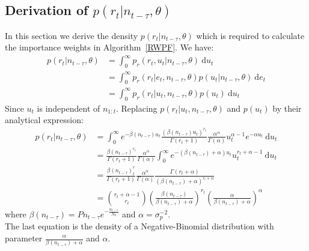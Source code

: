 \documentclass[12pt]{article}
\begin{document}
\begin{appendices}
	\subsection{Derivation of $p(r_t|n_{t-\tau}, \theta)$} \label{rDensity}
	In this section we derive the density $p(r_t|n_{t-\tau}, \theta)$ which is required to calculate the importance weights in Algorithm~\ref{RWPF}.
	We have:
	\begin{align*}
	p(r_t | n_{t-\tau}, \theta) & = \int_{0}^{\infty}p_r(r_t, u_t | n_{t-\tau}, \theta)\ \mathrm{d}u_t \\
	& = \int_{0}^{\infty}p_r(r_t | e_t, n_{t-\tau}, \theta)p(u_t | n_{t-\tau}, \theta)\ \mathrm{d}e_t \\
	& = \int_{0}^{\infty}p_r(r_t | u_t, n_{t-\tau}, \theta)p(u_t)\ \mathrm{d}u_t
	\end{align*}
	Since $u_t$ is independent of $n_{1:t}$.
	Replacing $p(r_t | u_t, n_{t-\tau}, \theta)$ and $p(u_t)$ by their analytical expression:
	\begin{align*}
	p(r_t | n_{t-\tau}, \theta) & = \int_{0}^{\infty}e^{-\beta(n_{t-\tau})u_t}\frac{(\beta(n_{t-\tau})u_t)^{r_t}}{\Gamma(r_t+1)}\frac{\alpha^\alpha}{\Gamma(\alpha)}u_t^{\alpha-1}e^{-\alpha u_t}\ \mathrm{d}u_t \\
	& = \frac{\beta(n_{t-\tau})^{r_t}}{\Gamma(r_t+1)}\frac{\alpha^\alpha}{\Gamma(\alpha)}\int_{0}^{\infty}e^{-(\beta(n_{t-\tau})+\alpha)u_t}u_t^{r_t+\alpha-1}\ \mathrm{d}u_t \\
	& = \frac{\beta(n_{t-\tau})^r_t}{\Gamma(r_t+1)}\frac{\alpha^\alpha}{\Gamma(\alpha)}\frac{\Gamma(r_t+\alpha)}{(\beta(n_{t-\tau})+\alpha)^{r_t+\alpha}} \\
	& = \binom{r_t + \alpha - 1}{r_t}(\frac{\beta(n_{t-\tau})}{\beta(n_{t-\tau}) + \alpha})^{r_t}(\frac{\alpha}{\beta(n_{t-\tau}) + \alpha})^\alpha
	\end{align*}
	where $\beta(n_{t-\tau}) = Pn_{t-\tau}e^{-\frac{n_{t-\tau}}{N_0}}$ and $\alpha = \sigma_p^{-2}$. \\
	The last equation is the density of a Negative-Binomial distribution with parameter $\frac{\alpha}{\beta(n_{t-\tau}) + \alpha}$ and $\alpha$.
	

\end{appendices}
\end{document}
